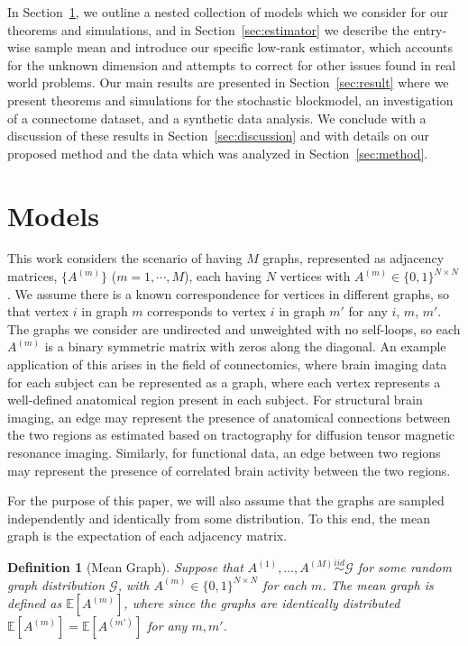 \documentclass[10pt,letterpaper]{article}
\newtheorem{definition}[fact]{Definition}
\newcommand{\Ex}{\mathbb{E}}
\begin{document}
In Section~\ref{section:model}, we outline a nested collection of models which we consider for our theorems and simulations, and in Section~\ref{sec:estimator} we describe the entry-wise sample mean and introduce our specific low-rank estimator, which accounts for the unknown dimension and attempts to correct for other issues found in real world problems.
Our main results are presented in Section~\ref{sec:result} where we present theorems and simulations for the stochastic blockmodel, an investigation of a connectome dataset, and a synthetic data analysis. 
We conclude with a discussion of these results in Section~\ref{sec:discussion}  and with details on our proposed method and the data which was analyzed in Section~\ref{sec:method}.


\section{Models}
\label{section:model}
This work considers the scenario of having $M$ graphs, represented as adjacency matrices, $\{A^{(m)}\}$ ($m = 1, \cdots, M$), each having $N$ vertices with $A^{(m)}\in\{0,1\}^{N\times N}$.
We assume there is a known correspondence for vertices in different graphs, so that vertex $i$ in graph $m$ corresponds to vertex $i$ in graph $m'$ for any $i$, $m$, $m'$.
The graphs we consider are undirected and unweighted with no self-loops, so each $A^{(m)}$ is a binary symmetric matrix with zeros along the diagonal. An example application of this arises in the field of connectomics, where  brain imaging data for each subject can be represented as a graph, where each vertex represents a well-defined anatomical region present in each subject.
For structural brain imaging, an edge may represent the presence of anatomical connections between the two regions as estimated based on tractography for diffusion tensor magnetic resonance imaging.
Similarly, for functional data, an edge between two regions may represent the presence of correlated brain activity between the two regions. 


For the purpose of this paper, we will also assume that the graphs are sampled independently and identically from some distribution.
To this end, the mean graph is the expectation of each adjacency matrix.
\begin{definition}[Mean Graph]
Suppose that $A^{(1)},\dotsc,A^{(M)}\stackrel{iid}{\sim} \mathcal{G}$ for some random graph distribution $\mathcal{G}$, with $A^{(m)}\in\{0,1\}^{N\times N}$ for each $m$.
The {\em mean graph} is defined as $\Ex[A^{(m)}]$, where since the graphs are identically distributed $\Ex[A^{(m)}]=\Ex[A^{(m')}]$ for any $m,m'$.
\end{definition}
\end{document}
